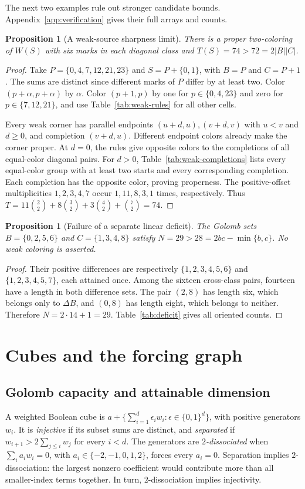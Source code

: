 \documentclass[11pt,a4paper]{article}
\newtheorem{proposition}[theorem]{Proposition}
\theoremstyle{definition}
\numberwithin{equation}{section}
\begin{document}
The next two examples rule out stronger candidate bounds.
Appendix~\ref{app:verification} gives their full arrays and counts.

\begin{proposition}[A weak-source sharpness limit]\label{prop:74}
There is a proper two-coloring of $W(S)$ with six marks in each
diagonal class and $T(S)=74>72=2|B||C|$.
\end{proposition}
\begin{proof}
Take $P=\{0,4,7,12,21,23\}$ and
$S=P+\{0,1\}$, with $B=P$ and $C=P+1$.
The sums are distinct since different marks of $P$ differ by at least two.
Color $(p+\alpha,p+\alpha)$ by $\alpha$.
Color $(p+1,p)$ by one for $p\in\{0,4,23\}$ and zero for
$p\in\{7,12,21\}$, and use Table~\ref{tab:weak-rules} for all other cells.

Every weak corner has parallel endpoints $(u+d,u),(v+d,v)$ with
$u<v$ and $d\ge0$, and completion $(v+d,u)$.
Different endpoint colors already make the corner proper. At $d=0$, the rules give opposite
colors to the completions of all equal-color diagonal pairs.
For $d>0$, Table~\ref{tab:weak-completions} lists every equal-color
group with at least two starts and every corresponding completion.
Each completion has the opposite color, proving properness.
The positive-offset multiplicities $1,2,3,4,7$ occur
$1,11,8,3,1$ times, respectively. Thus
$T=11\binom22+8\binom32+3\binom42+\binom72=74$.
\end{proof}

\begin{proposition}[Failure of a separate linear deficit]\label{prop:29}
The Golomb sets $B=\{0,2,5,6\}$ and $C=\{1,3,4,8\}$ satisfy
$N=29>28=2bc-\min\{b,c\}$. No weak coloring is asserted.
\end{proposition}
\begin{proof}
Their positive differences are respectively
$\{1,2,3,4,5,6\}$ and $\{1,2,3,4,5,7\}$, each attained once.
Among the sixteen cross-class pairs, fourteen have a length in both
difference sets. The pair $(2,8)$ has length six, which belongs only
to $\Delta B$, and $(0,8)$ has length eight, which belongs to neither.
Therefore $N=2\cdot14+1=29$.
Table~\ref{tab:deficit} gives all oriented counts.
\end{proof}

\section{Cubes and the forcing graph}\label{sec:cubes}
\subsection{Golomb capacity and attainable dimension}
A weighted Boolean cube is
$a+\{\sum_{i=1}^d\epsilon_iw_i:\epsilon\in\{0,1\}^d\}$,
with positive generators $w_i$.
It is \emph{injective} if its subset sums are distinct, and
\emph{separated} if $w_{i+1}>2\sum_{j\le i}w_j$ for every $i<d$.
The generators are \emph{$2$-dissociated} when
$\sum_i a_iw_i=0$, with $a_i\in\{-2,-1,0,1,2\}$, forces every $a_i=0$.
Separation implies $2$-dissociation: the largest nonzero coefficient
would contribute more than all smaller-index terms together.
In turn, $2$-dissociation implies injectivity.
\end{document}

